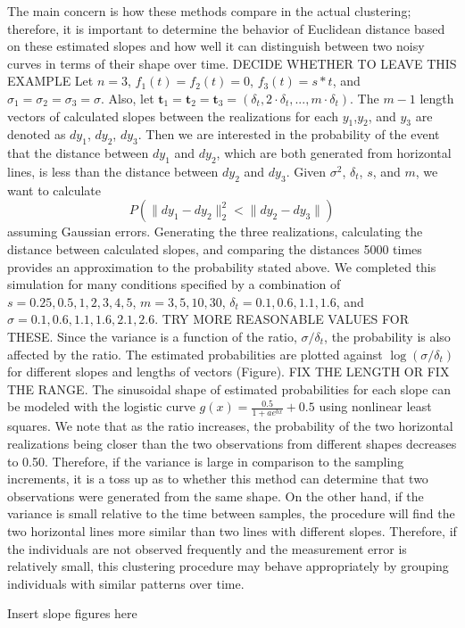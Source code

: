 \documentclass[12pt]{article}
\newcommand{\B}[0]{\mathbf}
\begin{document}
The main concern is how these methods compare in the actual clustering; therefore, it is important to determine the behavior of Euclidean distance based on these estimated slopes and how well it can distinguish between two noisy curves in terms of their shape over time. DECIDE WHETHER TO LEAVE THIS EXAMPLE Let $n=3$, $f_1(t) = f_2(t) =0$, $f_3(t)=s*t$, and $\sigma_1=\sigma_2=\sigma_3=\sigma$. Also, let $\B t_1 = \B t_2=\B t_3 = (\delta_t,2\cdot\delta_t,...,m\cdot\delta_t)$. The $m-1$ length vectors of calculated slopes between the realizations for each $y_1$,$y_2$, and $y_3$ are denoted as $dy_1$, $dy_2$, $dy_3$. Then we are interested in the probability of the event that the distance between $dy_1$ and $dy_2$, which are both generated from horizontal lines, is less than the distance between $dy_2$ and $dy_3$. Given $\sigma^2$, $\delta_t$, $s$, and $m$, we want to calculate
$$P(\|dy_1-dy_2\|^2_2 < \|dy_2-dy_3\|)$$
assuming Gaussian errors. Generating the three realizations, calculating the distance between calculated slopes, and comparing the distances 5000 times provides an approximation to the probability stated above. We completed this simulation for many conditions specified by a combination of $s = 0.25, 0.5, 1,2,3,4,5$, $m = 3,5,10,30$, $\delta_t = 0.1,0.6,1.1,1.6$, and $\sigma = 0.1,0.6,1.1,1.6,2.1,2.6$. TRY MORE REASONABLE VALUES FOR THESE. Since the variance is a function of the ratio, $\sigma/\delta_t$, the probability is also affected by the ratio. The estimated probabilities are plotted against $\log(\sigma/\delta_t)$ for different slopes and lengths of vectors (Figure). FIX THE LENGTH OR FIX THE RANGE. The sinusoidal shape of estimated probabilities for each slope can be modeled with the logistic curve $g(x) = \frac{0.5}{1+ae^{bx}}+0.5$ using nonlinear least squares. We note that as the ratio increases, the probability of the two horizontal realizations being closer than the two observations from different shapes decreases to 0.50. Therefore, if the variance is large in comparison to the sampling increments, it is a toss up as to whether this method can determine that two observations were generated from the same shape. On the other hand, if the variance is small relative to the time between samples, the procedure will find the two horizontal lines more similar than two lines with different slopes. Therefore, if the individuals are not observed frequently and the measurement error is relatively small, this clustering procedure may behave appropriately by grouping individuals with similar patterns over time. 
\begin{center}
Insert slope figures here
\end{center}
\end{document}
